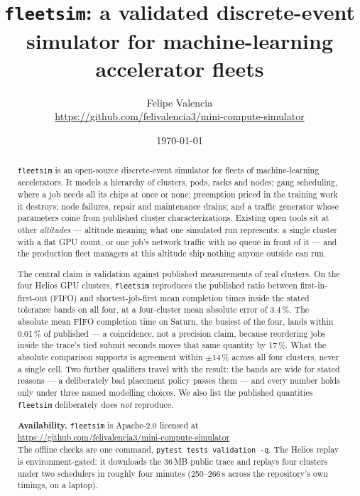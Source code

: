 \documentclass[11pt]{article}
\title{\texttt{fleetsim}: a validated discrete-event simulator for
       machine-learning accelerator fleets}
\author{Felipe Valencia\\[2pt]
  \normalsize\url{https://github.com/felivalencia3/mini-compute-simulator}}
\date{\today}
\begin{document}
\maketitle

\begin{abstract}
\noindent
\texttt{fleetsim} is an open-source discrete-event simulator for fleets of
machine-learning accelerators. It models a hierarchy of clusters, pods, racks
and nodes; gang scheduling, where a job needs all its chips at once or none;
preemption priced in the training work it destroys; node failures, repair and
maintenance drains; and a traffic generator whose parameters come from published
cluster characterizations. Existing open tools sit at other \emph{altitudes} ---
altitude meaning what one simulated run represents: a single cluster with a flat
GPU count, or one job's network traffic with no queue in front of it --- and the
production fleet managers at this altitude ship nothing anyone outside can run.

The central claim is validation against published measurements of real
clusters. On the four Helios GPU clusters, \texttt{fleetsim} reproduces the
published ratio between first-in-first-out (FIFO) and shortest-job-first mean
completion times inside the stated tolerance bands on all four, at a
four-cluster mean absolute error of 3.4\,\%. The absolute mean FIFO completion
time on Saturn, the busiest of the four, lands within 0.01\,\% of published ---
a coincidence, not a precision claim, because reordering jobs inside the trace's
tied submit seconds moves that same quantity by 17\,\%. What the absolute
comparison supports is agreement within $\pm 14$\,\% across all four clusters,
never a single cell. Two further qualifiers travel with the result: the bands
are wide for stated reasons --- a deliberately bad placement policy passes them
--- and every number holds only under three named modelling choices. We also
list the published quantities \texttt{fleetsim} deliberately does \emph{not}
reproduce.

\medskip
\noindent\textbf{Availability.} \texttt{fleetsim} is Apache-2.0 licensed at\\
\url{https://github.com/felivalencia3/mini-compute-simulator}\\
The offline checks are one command, \texttt{pytest tests validation -q}. The
Helios replay is environment-gated: it downloads the 36\,MB public trace and
replays four clusters under two schedulers in roughly four minutes
(250--266\,s across the repository's own timings, on a laptop).
\end{abstract}








\end{document}

